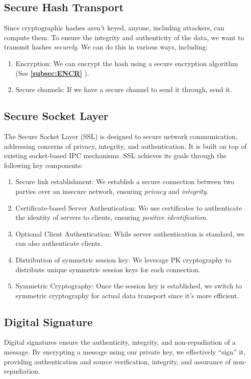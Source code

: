 \documentclass{report}
\newcommand{\refto}[2]{\textbf{\ref{#1:#2} \nameref{#1:#2}}}
\begin{document}
\subsection{Secure Hash Transport}
Since cryptographic hashes aren't keyed, anyone, including attackers, can compute them. To ensure
the integrity and authenticity of the data, we want to transmit hashes \textit{securely}. We can do
this in various ways, including:

\begin{enumerate}[label=\textit{(\roman*)}]
\item Encryption: We can encrypt the hash using a secure encryption algorithm (See \refto{subsec}{ENCR}).
\item Secure channels: If we have a secure channel to send it through, send it.
\end{enumerate}


\subsection{Secure Socket Layer}
The Secure Socket Layer (SSL) is designed to secure network communication, addressing concerns of
privacy, integrity, and authentication. It is built on top of existing socket-based IPC
mechanisms. SSL achieves its goals through the following key components:

\begin{enumerate}[label=\textit{(\roman*)}]
\item Secure link establishment: We establish a secure connection between two parties over an
  insecure network, ensuring \textit{privacy} and \textit{integrity}.
\item Certificate-based Server Authentication: We use certificates to authenticate the identity of
  servers to clients, ensuring \textit{positive identification}.
\item Optional Client Authentication: While server authentication is standard, we can also
  authenticate clients.
\item Distribution of symmetric session key: We leverage PK cryptography to distribute unique
  symmetric session keys for each connection.
\item Symmetric Cryptography: Once the session key is established, we switch to symmetric
  cryptography for actual data transport since it's more efficient.
\end{enumerate}


\subsection{Digital Signature}
Digital signatures ensure the authenticity, integrity, and non-repudiation of a message. By
encrypting a message using our private key, we effectively ``sign'' it, providing authentication and
source verification, integrity, and assurance of non-repudiation.
\end{document}
